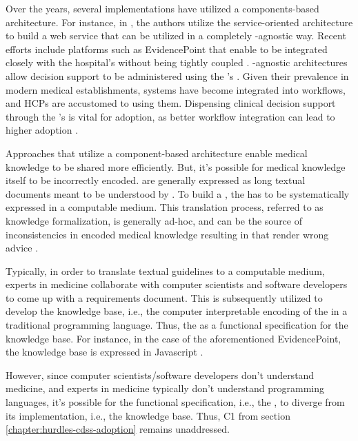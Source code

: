 Over the years, several \CDSS{} implementations have utilized a
components-based architecture. For instance, in \cite{KawamotoJBI10}, the
authors utilize the service-oriented architecture \cite{ErlBook05} to build
a \CDSS{} web service that can be utilized in a completely \EHR{}-agnostic way.
Recent efforts include \CDSSs{} platforms such as
EvidencePoint that enable \CDSS{} to be integrated
closely with the hospital's \EHR{} without being tightly coupled \cite{SolomonJMIR23}.
\EHR{}-agnostic architectures allow decision support to be administered using the
\EHR{}'s \UI{}. Given their prevalence in modern medical establishments,
\EHR{} systems have become integrated into workflows,
and HCPs are accustomed to using them. Dispensing clinical decision
support through the \EHR{}'s \UI{} is vital for adoption, as better workflow
integration can lead to higher adoption \cite{PressJMIR16,LiJMI16}.

Approaches that utilize a component-based architecture
enable medical knowledge to be shared more efficiently.
But, it's possible for medical knowledge itself to be incorrectly
encoded. \BPGs{} are generally expressed as long textual documents meant to
be understood by \HCPs{} \cite{SchiffmanYMI13}. To build a \CDSS{}, the \BPG{} has to be
systematically expressed in a computable medium. This translation process,
referred to as knowledge formalization, is generally ad-hoc, and can be
the source of inconsistencies in encoded medical knowledge
resulting in \CDSSs{} that render wrong advice \cite{ShaharIOS04}.

Typically, in order to translate textual guidelines to a computable
medium, experts in medicine collaborate with computer scientists and
software developers to come up with a requirements document.
This is subsequently utilized to develop the knowledge base, i.e.,
the computer interpretable encoding of the \BPG{} \cite{PelegJBI13} in a
traditional programming language. Thus, the \BPG{} as a
functional specification for the knowledge base.
For instance, in the case of the aforementioned EvidencePoint,
the knowledge base is expressed in  Javascript \cite{SolomonJMIR23}.

However, since computer scientists/software
developers don't understand medicine, and experts in medicine typically
don't understand programming languages,
it's possible for the functional specification, i.e., the \BPG{}, to
diverge from its implementation, i.e., the knowledge base. Thus,
C1 from section \ref{chapter:hurdles-cdss-adoption} remains unaddressed.

